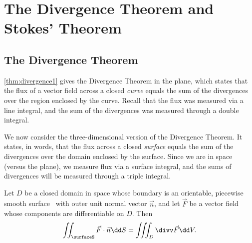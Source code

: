 \section{The Divergence Theorem and Stokes' Theorem}\label{sec:stokes_divergence}

\subsection{The Divergence Theorem}

\autoref{thm:divergence1} gives the Divergence Theorem in the plane, which states that the flux of a vector field across a closed \emph{curve} equals the sum of the divergences over the region enclosed by the curve. Recall that the flux was measured via a line integral, and the sum of the divergences was measured through a double integral.

We now consider the three-dimensional version of the Divergence Theorem. It states, in words, that the flux across a closed \emph{surface} equals the sum of the divergences over the domain enclosed by the surface. Since we are in space (versus the plane), we measure flux via a surface integral, and the sums of divergences will be measured through a triple integral.


\begin{theorem}\label{thm:divergence2}%
Let $D$ be a closed domain in space whose boundary is an orientable, piecewise smooth surface \surfaceS\ with outer unit normal vector $\vec n$, and let $\vec F$ be a vector field whose components are differentiable on $D$. Then
\[\iint_{\surfaceS} \vec F\cdot\vec n\dd S =\iiint_D \divv \vec F\dd V.\]
\end{theorem}



